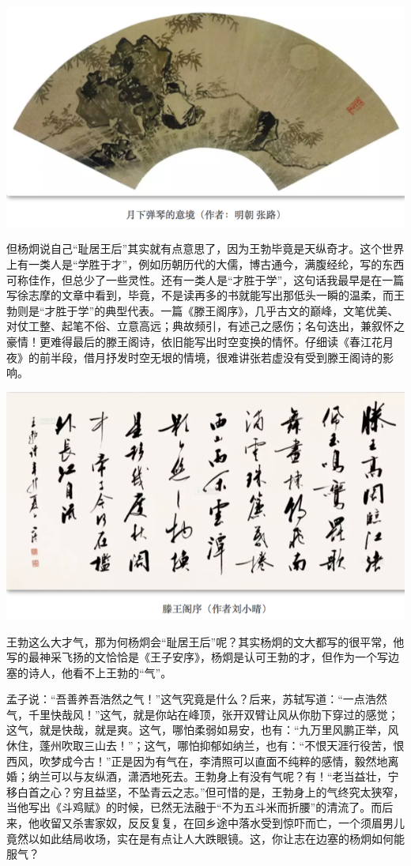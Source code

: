 \documentclass[
]{book}
\begin{document}
\includegraphics[width=8.33in]{images/ctsj4}

但杨炯说自己``耻居王后''其实就有点意思了，因为王勃毕竟是天纵奇才。这个世界上有一类人是``学胜于才''，例如历朝历代的大儒，博古通今，满腹经纶，写的东西可称佳作，但总少了一些灵性。还有一类人是``才胜于学''，这句话我最早是在一篇写徐志摩的文章中看到，毕竟，不是读再多的书就能写出那低头一瞬的温柔，而王勃则是``才胜于学''的典型代表。一篇《滕王阁序》，几乎古文的巅峰，文笔优美、对仗工整、起笔不俗、立意高远；典故频引，有述己之感伤；名句迭出，兼叙怀之豪情！更难得最后的滕王阁诗，依旧能写出时空变换的情怀。仔细读《春江花月夜》的前半段，借月抒发时空无垠的情境，很难讲张若虚没有受到滕王阁诗的影响。

\includegraphics[width=8.33in]{images/ctsj5}

王勃这么大才气，那为何杨炯会``耻居王后''呢？其实杨炯的文大都写的很平常，他写的最神采飞扬的文恰恰是《王子安序》，杨炯是认可王勃的才，但作为一个写边塞的诗人，他看不上王勃的``气''。

孟子说：``吾善养吾浩然之气！''这气究竟是什么？后来，苏轼写道：``一点浩然气，千里快哉风！''这气，就是你站在峰顶，张开双臂让风从你肋下穿过的感觉；这气，就是快哉，就是爽。这气，哪怕柔弱如易安，也有：``九万里风鹏正举，风休住，蓬州吹取三山去！''；这气，哪怕抑郁如纳兰，也有：``不恨天涯行役苦，恨西风，吹梦成今古！''正是因为有气在，李清照可以直面不纯粹的感情，毅然地离婚；纳兰可以与友纵酒，潇洒地死去。王勃身上有没有气呢？有！``老当益壮，宁移白首之心？穷且益坚，不坠青云之志。''但可惜的是，王勃身上的气终究太狭窄，当他写出《斗鸡赋》的时候，已然无法融于``不为五斗米而折腰''的清流了。而后来，他收留又杀害家奴，反反复复，在回乡途中落水受到惊吓而亡，一个须眉男儿竟然以如此结局收场，实在是有点让人大跌眼镜。这，你让志在边塞的杨炯如何能服气？
\end{document}
